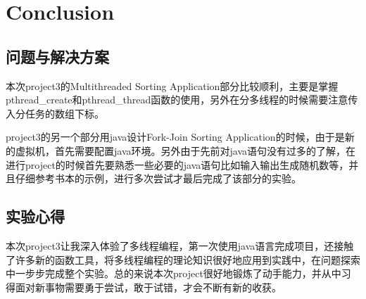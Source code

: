 \documentclass{article}
\begin{document}
\section{Conclusion}

\subsection{问题与解决方案}
本次project3的Multithreaded Sorting Application部分比较顺利，主要是掌握pthread\_create和pthread\_thread函数的使用，另外在分多线程的时候需要注意传入分任务的数组下标。

project3的另一个部分用java设计Fork-Join Sorting Application的时候，由于是新的虚拟机，首先需要配置java环境。另外由于先前对java语句没有过多的了解，在进行project的时候首先要熟悉一些必要的java语句比如输入输出生成随机数等，并且仔细参考书本的示例，进行多次尝试才最后完成了该部分的实验。

\subsection{实验心得}
本次project3让我深入体验了多线程编程，第一次使用java语言完成项目，还接触了许多新的函数工具，将多线程编程的理论知识很好地应用到实践中，在问题探索中一步步完成整个实验。总的来说本次project很好地锻炼了动手能力，并从中习得面对新事物需要勇于尝试，敢于试错，才会不断有新的收获。



\end{document}
